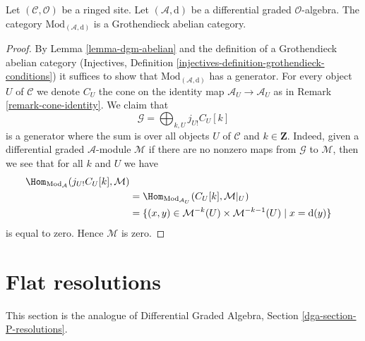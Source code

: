 \begin{lemma}
\label{lemma-dgm-grothendieck-abelian}
Let $(\mathcal{C}, \mathcal{O})$ be a ringed site.
Let $(\mathcal{A}, \text{d})$ be a differential graded $\mathcal{O}$-algebra.
The category $\text{Mod}_{(\mathcal{A}, \text{d})}$
is a Grothendieck abelian category.
\end{lemma}

\begin{proof}
By Lemma \ref{lemma-dgm-abelian} and the definition of a Grothendieck
abelian category
(Injectives, Definition \ref{injectives-definition-grothendieck-conditions})
it suffices to
show that $\text{Mod}_{(\mathcal{A}, \text{d})}$
has a generator. For every object $U$ of $\mathcal{C}$ we denote
$C_U$ the cone on the identity map $\mathcal{A}_U \to \mathcal{A}_U$
as in Remark \ref{remark-cone-identity}. We claim that
$$
\mathcal{G} = \bigoplus\nolimits_{k, U} j_{U!}C_U[k]
$$
is a generator where the sum is over all objects $U$ of $\mathcal{C}$
and $k \in \mathbf{Z}$. Indeed, given a
differential graded $\mathcal{A}$-module $\mathcal{M}$
if there are no nonzero maps from $\mathcal{G}$ to $\mathcal{M}$,
then we see that for all $k$ and $U$ we have
\begin{align*}
\Hom_{\text{Mod}_\mathcal{A}}(j_{U!}C_U[k], \mathcal{M}) \\
& =
\Hom_{\text{Mod}_{\mathcal{A}_U}}(C_U[k], \mathcal{M}|_U) \\
& =
\{(x, y) \in \mathcal{M}^{-k}(U) \times \mathcal{M}^{-k - 1}(U) \mid
x = \text{d}(y)\}
\end{align*}
is equal to zero. Hence $\mathcal{M}$ is zero.
\end{proof}











\section{Flat resolutions}
\label{section-P-resolutions}

\noindent
This section is the analogue of
Differential Graded Algebra, Section \ref{dga-section-P-resolutions}.

